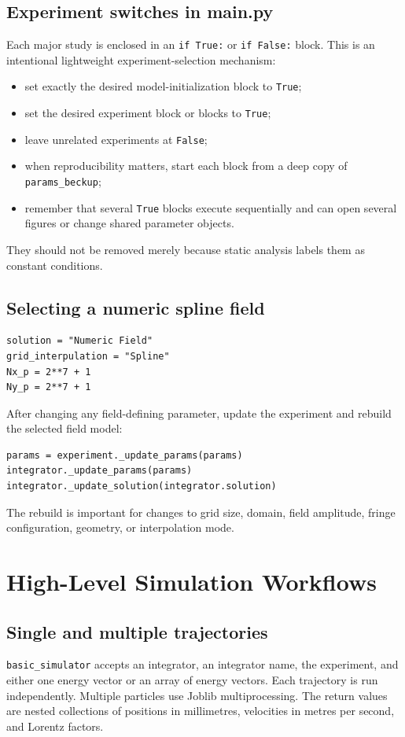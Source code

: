 \documentclass[11pt,a4paper]{report}
\newcommand{\code}[1]{\texttt{#1}}
\begin{document}
\section{Experiment switches in main.py}
Each major study is enclosed in an \code{if True:} or \code{if False:} block.
This is an intentional lightweight experiment-selection mechanism:
\begin{itemize}[noitemsep]
  \item set exactly the desired model-initialization block to \code{True};
  \item set the desired experiment block or blocks to \code{True};
  \item leave unrelated experiments at \code{False};
  \item when reproducibility matters, start each block from a deep copy of
        \code{params\_beckup};
  \item remember that several \code{True} blocks execute sequentially and can
        open several figures or change shared parameter objects.
\end{itemize}
They should not be removed merely because static analysis labels them as
constant conditions.

\section{Selecting a numeric spline field}
\begin{lstlisting}
solution = "Numeric Field"
grid_interpulation = "Spline"
Nx_p = 2**7 + 1
Ny_p = 2**7 + 1
\end{lstlisting}
After changing any field-defining parameter, update the experiment and rebuild
the selected field model:
\begin{lstlisting}
params = experiment._update_params(params)
integrator._update_params(params)
integrator._update_solution(integrator.solution)
\end{lstlisting}
The rebuild is important for changes to grid size, domain, field amplitude,
fringe configuration, geometry, or interpolation mode.

\chapter{High-Level Simulation Workflows}

\section{Single and multiple trajectories}
\code{basic\_simulator} accepts an integrator, an integrator name, the
experiment, and either one energy vector or an array of energy vectors.  Each
trajectory is run independently.  Multiple particles use Joblib
multiprocessing.  The return values are nested collections of positions in
millimetres, velocities in metres per second, and Lorentz factors.
\end{document}
